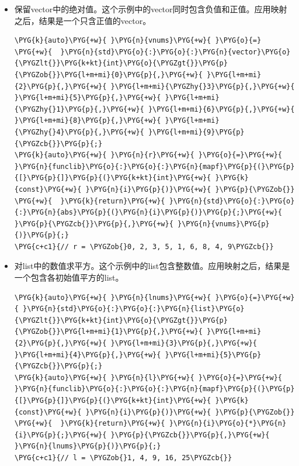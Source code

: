 \begin{itemize}
\item 保留vector中的绝对值。这个示例中的vector同时包含负值和正值。应用映射之后，结果是一个只含正值的vector。



\begin{codeblockbg}
\begin{Verbatim}[commandchars=\\\{\},breaklines=true,breakanywhere=true,fontsize=\codefont,xleftmargin=17bp]
\PYG{k}{auto}\PYG{+w}{ }\PYG{n}{vnums}\PYG{+w}{ }\PYG{o}{=}
\PYG{+w}{  }\PYG{n}{std}\PYG{o}{:}\PYG{o}{:}\PYG{n}{vector}\PYG{o}{\PYGZlt{}}\PYG{k+kt}{int}\PYG{o}{\PYGZgt{}}\PYG{p}{\PYGZob{}}\PYG{l+m+mi}{0}\PYG{p}{,}\PYG{+w}{ }\PYG{l+m+mi}{2}\PYG{p}{,}\PYG{+w}{ }\PYG{l+m+mi}{\PYGZhy{}3}\PYG{p}{,}\PYG{+w}{ }\PYG{l+m+mi}{5}\PYG{p}{,}\PYG{+w}{ }\PYG{l+m+mi}{\PYGZhy{}1}\PYG{p}{,}\PYG{+w}{ }\PYG{l+m+mi}{6}\PYG{p}{,}\PYG{+w}{ }\PYG{l+m+mi}{8}\PYG{p}{,}\PYG{+w}{ }\PYG{l+m+mi}{\PYGZhy{}4}\PYG{p}{,}\PYG{+w}{ }\PYG{l+m+mi}{9}\PYG{p}{\PYGZcb{}}\PYG{p}{;}
\PYG{k}{auto}\PYG{+w}{ }\PYG{n}{r}\PYG{+w}{ }\PYG{o}{=}\PYG{+w}{ }\PYG{n}{funclib}\PYG{o}{:}\PYG{o}{:}\PYG{n}{mapf}\PYG{p}{(}\PYG{p}{[}\PYG{p}{]}\PYG{p}{(}\PYG{k+kt}{int}\PYG{+w}{ }\PYG{k}{const}\PYG{+w}{ }\PYG{n}{i}\PYG{p}{)}\PYG{+w}{ }\PYG{p}{\PYGZob{}}
\PYG{+w}{  }\PYG{k}{return}\PYG{+w}{ }\PYG{n}{std}\PYG{o}{:}\PYG{o}{:}\PYG{n}{abs}\PYG{p}{(}\PYG{n}{i}\PYG{p}{)}\PYG{p}{;}\PYG{+w}{ }\PYG{p}{\PYGZcb{}}\PYG{p}{,}\PYG{+w}{ }\PYG{n}{vnums}\PYG{p}{)}\PYG{p}{;}
\PYG{c+c1}{// r = \PYGZob{}0, 2, 3, 5, 1, 6, 8, 4, 9\PYGZcb{}}
\end{Verbatim}
\end{codeblockbg}



\item 对list中的数值求平方。这个示例中的list包含整数值。应用映射之后，结果是一个包含各初始值平方的list。



\begin{codeblockbg}
\begin{Verbatim}[commandchars=\\\{\},breaklines=true,breakanywhere=true,fontsize=\codefont,xleftmargin=17bp]
\PYG{k}{auto}\PYG{+w}{ }\PYG{n}{lnums}\PYG{+w}{ }\PYG{o}{=}\PYG{+w}{ }\PYG{n}{std}\PYG{o}{:}\PYG{o}{:}\PYG{n}{list}\PYG{o}{\PYGZlt{}}\PYG{k+kt}{int}\PYG{o}{\PYGZgt{}}\PYG{p}{\PYGZob{}}\PYG{l+m+mi}{1}\PYG{p}{,}\PYG{+w}{ }\PYG{l+m+mi}{2}\PYG{p}{,}\PYG{+w}{ }\PYG{l+m+mi}{3}\PYG{p}{,}\PYG{+w}{ }\PYG{l+m+mi}{4}\PYG{p}{,}\PYG{+w}{ }\PYG{l+m+mi}{5}\PYG{p}{\PYGZcb{}}\PYG{p}{;}
\PYG{k}{auto}\PYG{+w}{ }\PYG{n}{l}\PYG{+w}{ }\PYG{o}{=}\PYG{+w}{ }\PYG{n}{funclib}\PYG{o}{:}\PYG{o}{:}\PYG{n}{mapf}\PYG{p}{(}\PYG{p}{[}\PYG{p}{]}\PYG{p}{(}\PYG{k+kt}{int}\PYG{+w}{ }\PYG{k}{const}\PYG{+w}{ }\PYG{n}{i}\PYG{p}{)}\PYG{+w}{ }\PYG{p}{\PYGZob{}}
\PYG{+w}{  }\PYG{k}{return}\PYG{+w}{ }\PYG{n}{i}\PYG{o}{*}\PYG{n}{i}\PYG{p}{;}\PYG{+w}{ }\PYG{p}{\PYGZcb{}}\PYG{p}{,}\PYG{+w}{ }\PYG{n}{lnums}\PYG{p}{)}\PYG{p}{;}
\PYG{c+c1}{// l = \PYGZob{}1, 4, 9, 16, 25\PYGZcb{}}
\end{Verbatim}
\end{codeblockbg}



\end{itemize}
